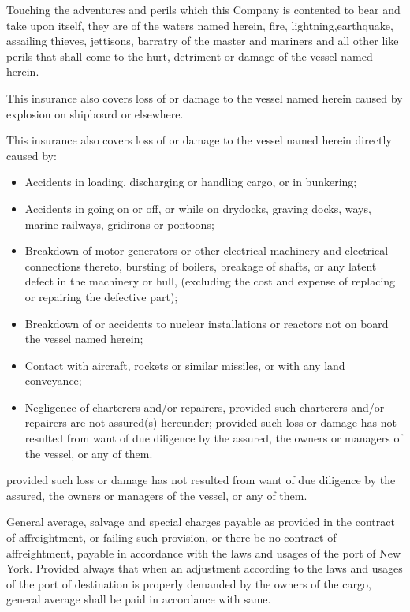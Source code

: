 \documentclass[10pt]{article}
\begin{document}
\resetlinenumber
\begin{linenumbers} 
\small {} Touching the adventures and perils which this Company is contented to bear and take upon itself, they are of   the   waters   named   herein,   fire,   lightning,earthquake,   assailing   thieves,   jettisons,   barratry   of   the   master   and mariners and all other like perils that shall come to the hurt, detriment or damage of the vessel named herein. 
    
    This  insurance  also  covers  loss  of  or  damage  to  the  vessel  named  herein  caused  by  explosion  on  shipboard  or elsewhere.
     

\noindent This insurance also covers loss of or damage to the vessel named herein directly caused by:
\begin{itemize}
    \item Accidents in loading, discharging or handling cargo, or in bunkering;
    \item Accidents  in  going  on  or  off,  or  while  on  drydocks,  graving  docks,  ways,  marine  railways,  gridirons  or pontoons; 
    \item Breakdown   of   motor   generators   or   other   electrical   machinery and   electrical   connections   thereto,   bursting of   boilers,   breakage   of   shafts,   or   any   latent   defect   in   the   machinery   or   hull,	(excluding   the   cost   and expense of replacing or repairing the defective part);
    \item Breakdown of or accidents to nuclear installations or reactors not on board the vessel named herein;
    \item Contact with aircraft, rockets or similar missiles, or with any land conveyance;
    \item Negligence   of   charterers   and/or   repairers,   provided   such   charterers   and/or   repairers   are   not   assured(s) hereunder; provided  such  loss  or  damage  has  not  resulted  from  want  of  due  diligence  by  the  assured,  the  owners  or  managers
    of the vessel, or any of them.
\end{itemize}
provided  such  loss  or  damage  has  not  resulted  from  want  of  due  diligence  by  the  assured,  the  owners  or  managers of the vessel, or any of them. 

General   average,   salvage and special charges payable as provided in the contract of affreightment, or failing such  provision,  or  there  be  no  contract  of  affreightment,  payable  in  accordance  with  the  laws  and  usages of   the   port   of   New   York.  Provided   always   that   when   an   adjustment   according   to   the   laws   and   usages of the port  of  destination  is  properly  demanded  by  the  owners  of  the  cargo,  general  average  shall  be  paid  in  accordance with same. 


\end{linenumbers}
\end{document}
